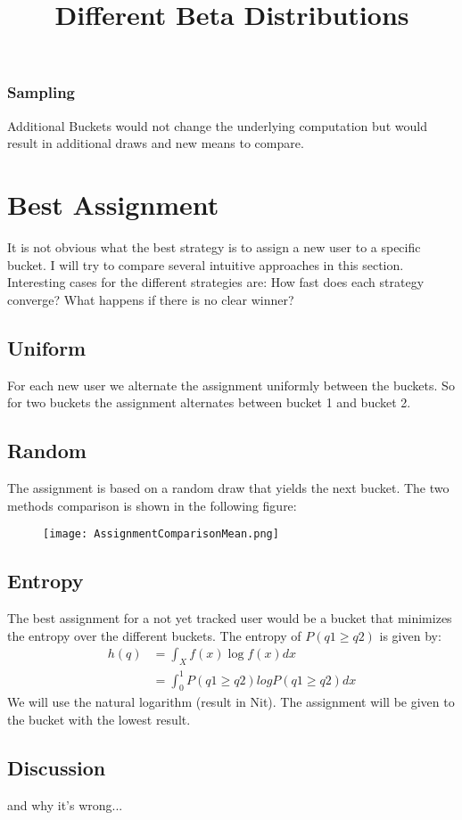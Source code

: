 \documentclass[../Thesis.tex]{subfiles}
\begin{document}
\subsubsection{Sampling}
Additional Buckets would not change the underlying computation but would result in additional draws and new means to compare. 

\section{Best Assignment}
It is not obvious what the best strategy is to assign a new user to a specific bucket. I will try to compare several intuitive approaches in this section. Interesting cases for the different strategies are: How fast does each strategy converge? What happens if there is no clear winner?
\subsection{Uniform}
For each new user we alternate the assignment uniformly between the buckets. So for two buckets the assignment alternates between bucket 1 and bucket 2.
\subsection{Random}
The assignment is based on a random draw that yields the next bucket. The two methods comparison is shown in the following figure:
\begin{figure}[ht]
\texttt{[image: AssignmentComparisonMean.png]}
\centering
\title{Different Beta Distributions}
\end{figure}
\subsection{Entropy}
The best assignment for a not yet tracked user would be a bucket that minimizes the entropy over the different buckets. The entropy of $P(q1\geq q2)$ is given by:
\begin{align*}
h(q) 	&= \int_{X}f(x)\log f(x)dx \\
		&= \int_{0}^{1} P(q1\geq q2)log P(q1\geq q2)dx
\end{align*}
We will use the natural logarithm (result in Nit). The assignment will be given to the bucket with the lowest result.
\subsection{Discussion}
and why it's wrong...
\end{document}
